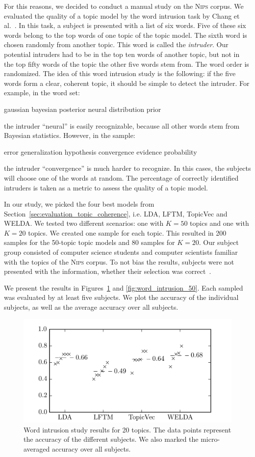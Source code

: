 \documentclass[
        a4paper,
        titlepage,
        twoside,
        parskip
        ]{scrbook}
\newcommand{\topicbox}[1]{
  \setlength{\OuterFrameSep}{0pt}
  \begin{framed}
    #1
  \end{framed}
}
\theoremstyle{break}
\begin{document}
For this reasons, we decided to conduct a manual study on the \textsc{Nips} corpus.
We evaluated the quality of a topic model by the word intrusion task by Chang et al.~\cite{Chang2009}.
In this task, a subject is presented with a list of six words.
Five of these six words belong to the top words of one topic of the topic model.
The sixth word is chosen randomly from another topic.
This word is called the \emph{intruder}.
Our potential intruders had to be in the top ten words of another topic, but not in the top fifty words of the topic the other five words stem from.
The word order is randomized.
The idea of this word intrusion study is the following: if the five words form a clear, coherent topic, it should be simple to detect the intruder.
For example, in the word set:
\topicbox{gaussian bayesian posterior neural distribution prior}
the intruder ``neural'' is easily recognizable, because all other words stem from Bayesian statistics.
However, in the sample:
\topicbox{error generalization hypothesis convergence evidence probability}
the intruder ``convergence'' is much harder to recognize.
In this cases, the subjects will choose one of the words at random.
The percentage of correctly identified intruders is taken as a metric to assess the quality of a topic model.

In our study, we picked the four best models from Section~\ref{sec:evaluation_topic_coherence}, i.e. LDA, LFTM, TopicVec and WELDA.
We tested two different scenarios: one with $K = 50$ topics and one with $K = 20$ topics.
We created one sample for each topic.
This resulted in 200 samples for the 50-topic topic models and 80 samples for $K = 20$.
Our subject group consisted of computer science students and computer scientists familiar with the topics of the \textsc{Nips} corpus.
To not bias the results, subjects were not presented with the information, whether their selection was correct~\cite{Chang2009}.

We present the results in Figures~\ref{fig:word_intrusion_20} and \ref{fig:word_intrusion_50}.
Each sampled was evaluated by at least five subjects.
We plot the accuracy of the individual subjects, as well as the average accuracy over all subjects.

\begin{figure}
       \centering
       \includegraphics[width=12cm]{figures/word_intrusion_20.png}
       \caption{Word intrusion study results for 20 topics. The data points represent the accuracy of the different subjects. We also marked the micro-averaged accuracy over all subjects.}
       \label{fig:word_intrusion_20}
\end{figure}
\end{document}
